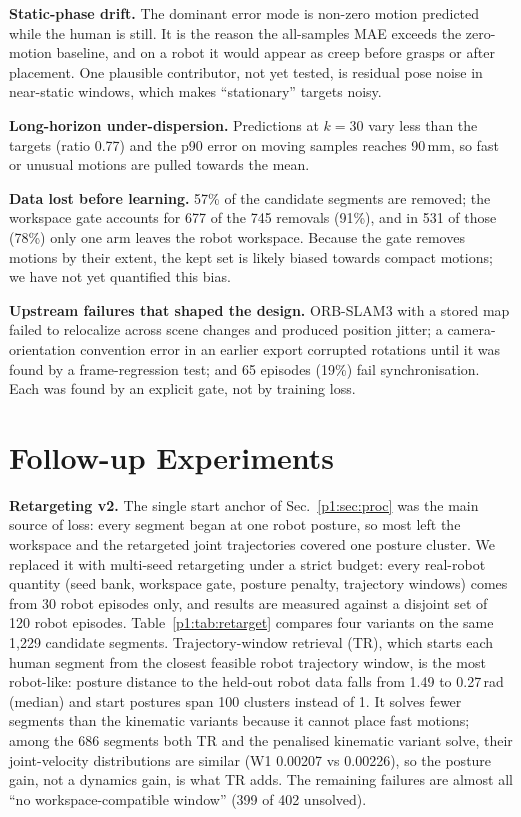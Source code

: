 \documentclass[conference,10pt]{IEEEtran}
\newcommand{\mm}{\,mm\xspace}
\begin{document}
\textbf{Static-phase drift.} The dominant error mode is non-zero motion predicted while the human is still. It is the reason
the all-samples MAE exceeds the zero-motion baseline, and on a robot it would appear as creep before grasps or after placement.
One plausible contributor, not yet tested, is residual pose noise in near-static windows, which makes ``stationary'' targets noisy.

\textbf{Long-horizon under-dispersion.} Predictions at $k{=}30$ vary less than the targets (ratio 0.77) and the p90 error on
moving samples reaches 90\mm, so fast or unusual motions are pulled towards the mean.

\textbf{Data lost before learning.} 57\% of the candidate segments are removed; the workspace gate accounts for 677 of the 745
removals (91\%), and in 531 of those (78\%) only one arm leaves the robot workspace. Because the gate removes motions by
their extent, the kept set is likely biased towards compact motions; we have not yet quantified this bias.

\textbf{Upstream failures that shaped the design.} ORB-SLAM3 with a stored map failed to relocalize across scene changes and
produced position jitter; a camera-orientation convention error in an earlier export corrupted rotations until it was found by a frame-regression test; and 65 episodes (19\%) fail synchronisation. Each was found by an explicit gate,
not by training loss.

\section{Follow-up Experiments}\label{p1:sec:follow}
\textbf{Retargeting v2.} The single start anchor of Sec.~\ref{p1:sec:proc} was the main source of loss: every segment began at
one robot posture, so most left the workspace and the retargeted joint trajectories covered one posture cluster. We replaced
it with multi-seed retargeting under a strict budget: every real-robot quantity (seed bank, workspace gate, posture
penalty, trajectory windows) comes from 30 robot episodes only, and results are measured against a disjoint set of 120
robot episodes. Table~\ref{p1:tab:retarget} compares four variants on the same 1{,}229 candidate segments. Trajectory-window
retrieval (TR), which starts each human segment from the closest feasible robot trajectory window, is the most
robot-like: posture distance to the held-out robot data falls from 1.49 to 0.27\,rad (median) and start postures span 100
clusters instead of 1. It solves fewer segments than the kinematic variants because it cannot place fast motions; among the
686 segments both TR and the penalised kinematic variant solve, their joint-velocity distributions are similar (W1 0.00207
vs 0.00226), so the posture gain, not a dynamics gain, is what TR adds. The remaining failures are almost all ``no
workspace-compatible window'' (399 of 402 unsolved).
\end{document}

